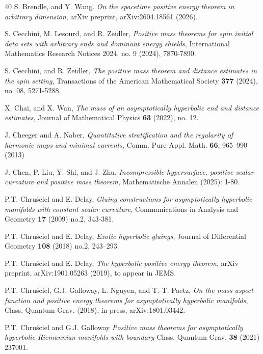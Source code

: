 \documentclass[11pt]{amsart}
\theoremstyle{remark}
\numberwithin{equation}{section}
\begin{document}
{{\begin{thebibliography}{40}
 S. Brendle,  and Y. Wang.  {\em On the spacetime positive energy theorem in arbitrary dimension}, arXiv preprint, arXiv:2604.18561 (2026). 

S. Cecchini, M. Lesourd, and R. Zeidler, {\em Positive mass theorems for spin initial data sets with arbitrary ends and dominant energy shields}, International Mathematics Research Notices 2024, no. 9 (2024), 7870-7890.

S. Cecchini, and R. Zeidler, {\em The positive mass theorem and distance estimates in the spin setting}, Transactions of the American Mathematical Society \textbf {377} (2024), no. 08, 5271-5288.

X. Chai, and X. Wan, {\em The mass of an asymptotically hyperbolic end and distance estimates}, Journal of Mathematical Physics \textbf{63} (2022), no. 12.

J. Cheeger and A. Naber, {\em Quantitative stratification and the regularity of harmonic maps and minimal currents}, Comm. Pure Appl. Math.  \textbf{66}, 965–990 (2013)

J. Chen, P. Liu, Y. Shi, and J. Zhu, {\em Incompressible hypersurface, positive scalar curvature and positive mass theorem}, Mathematische Annalen (2025): 1-80. 


 P.T. Chruściel and E. Delay, {\em Gluing constructions for asymptotically hyperbolic manifolds with constant scalar curvature}, Communications in Analysis and Geometry \textbf{17} (2009) no.2, 343-381.  

 P.T. Chruściel and E. Delay, {\em Exotic hyperbolic gluings}, Journal of Differential Geometry \textbf{108} (2018) no.2, 243–293.  

 P.T. Chruściel and E. Delay, {\em The hyperbolic positive energy theorem}, arXiv preprint, arXiv:1901.05263 (2019),  to appear in JEMS.  

 P.T. Chruściel, G.J. Galloway, L. Nguyen, and T.-T. Paetz, {\em On the mass
aspect function and positive energy theorems for asymptotically hyperbolic
manifolds}, Class. Quantum Grav. (2018), in press, arXiv:1801.03442. 

 P.T. Chruściel and G.J. Galloway {\em Positive mass theorems for asymptotically hyperbolic Riemannian manifolds with boundary} Class. Quantum Grav.  \textbf{38}  (2021) 237001.  


\end{thebibliography}}}
\end{document}
